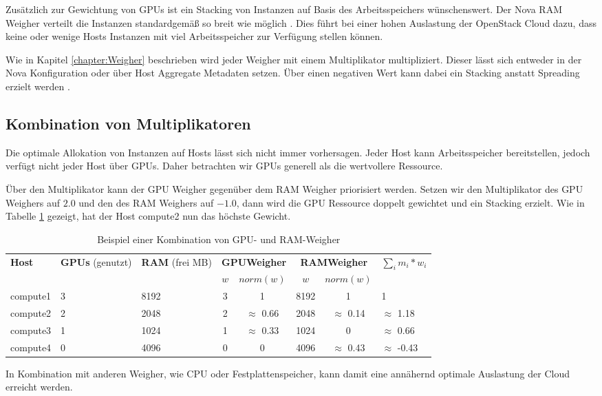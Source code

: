 \documentclass[../Main.tex]{subfiles}
\begin{document}
Zusätzlich zur Gewichtung von GPUs ist ein Stacking von Instanzen auf Basis des Arbeitsspeichers
wünschenswert. Der Nova RAM Weigher verteilt die Instanzen standardgemä{\ss} so breit wie möglich \citep{NormalizedWeights}.
Dies führt bei einer hohen Auslastung der OpenStack Cloud dazu, dass keine oder wenige Hosts Instanzen
mit viel Arbeitsspeicher zur Verfügung stellen können.

Wie in Kapitel \ref{chapter:Weigher} beschrieben wird jeder Weigher mit einem Multiplikator multipliziert. Dieser
lässt sich entweder in der Nova Konfiguration oder über Host Aggregate Metadaten setzen.
Über einen negativen Wert kann dabei ein Stacking anstatt Spreading erzielt werden \citep{ComputeSchedulers}.

\subsection{Kombination von Multiplikatoren}

Die optimale Allokation von Instanzen auf Hosts lässt sich nicht immer vorhersagen.
Jeder Host kann Arbeitsspeicher bereitstellen, jedoch verfügt nicht jeder Host über GPUs.
Daher betrachten wir GPUs generell als die \glqq wertvollere\grqq{} Ressource.

Über den Multiplikator kann der GPU Weigher gegenüber dem RAM Weigher priorisiert werden. Setzen wir
den Multiplikator des GPU Weighers auf $2.0$ und den des RAM Weighers auf $-1.0$, dann wird
die GPU Ressource doppelt gewichtet und ein Stacking erzielt.
Wie in Tabelle \ref{table:CombinedWeighingExample} gezeigt, hat der Host compute2 nun
das höchste Gewicht.

\begin{table}[H]
    \centering
    \caption{Beispiel einer Kombination von GPU- und RAM-Weigher}
    \renewcommand{\arraystretch}{1.2}
    \begin{tabular}{|p{1.75cm}|p{1.75cm}|p{1.75cm}|c|c|c|c|p{2cm}|}
      \hline
      \multirow{2}{1.75cm}{\textbf{Host}} & \multirow{2}{1.75cm}{\textbf{GPUs} (genutzt)}
      & \multirow{2}{1.75cm}{\textbf{RAM} (frei MB)}
      & \multicolumn{2}{c|}{\textbf{GPUWeigher}}
      & \multicolumn{2}{c|}{\textbf{RAMWeigher}}
      & \multirow{2}{2cm}{$\sum_i m_i * w_i$} \\
      \cline{4-7} & & & \textbf{$w$} & \textbf{$norm(w)$} & \textbf{$w$} & \textbf{$norm(w)$} & \\
      \hline
      compute1 & 3 & 8192 & 3 & \phantom{$\approx$} 1\phantom{.00} & 8192 & \phantom{$\approx$} 1\phantom{.00} & \phantom{$\approx$} \phantom{-}1 \\ \hline
      compute2 & 2 & 2048 & 2 & $\approx$ 0.66 & 2048 & $\approx$ 0.14 & $\approx$ \phantom{-}1.18 \\ \hline
      compute3 & 1 & 1024 & 1 &  $\approx$ 0.33 & 1024 & \phantom{$\approx$} 0\phantom{.00} & $\approx$ \phantom{-}0.66 \\ \hline
      compute4 & 0 & 4096 & 0 & \phantom{$\approx$} 0\phantom{.00} & 4096 & $\approx$ 0.43 & $\approx$ -0.43 \\ \hline
    \end{tabular}
    \label{table:CombinedWeighingExample}
  \end{table}

In Kombination mit anderen Weigher, wie CPU oder Festplattenspeicher,
kann damit eine annähernd optimale Auslastung der Cloud erreicht werden.

\biblio %
\end{document}
